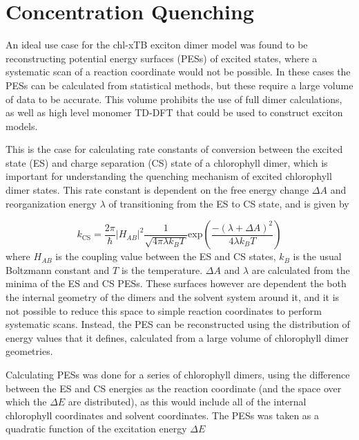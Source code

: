 \afterpartskip
\section{Concentration Quenching}
\label{sec:concentration_quenching}

An ideal use case for the chl-xTB exciton dimer model was found to be reconstructing
potential energy surfaces (PESs) of excited states, where a systematic scan of a
reaction coordinate would not be possible. In these cases the PESs can be calculated
from statistical methods, but these require a large volume of data to be accurate.
This volume prohibits the use of full dimer calculations, as well as high level
monomer TD-DFT that could be used to construct exciton models.

This is the case for calculating rate constants of conversion between the excited 
state (ES) and charge separation (CS) state of a chlorophyll dimer, which is important
for understanding the quenching mechanism of excited chlorophyll dimer states. This
rate constant is dependent on the free energy change $\Delta A$ and reorganization
energy $\lambda$ of transitioning from the ES to CS state, and is given by

\begin{equation}
    k_{\text{CS}} = \frac{2\pi}{\hbar} \left\lvert H_{AB} \right\rvert^2 \frac{1}{\sqrt{4 \pi \lambda k_B T}}\text{exp}\left(\frac{-\left(\lambda + \Delta A\right)^2}{4 \lambda k_B T}\right)
\end{equation}
%
where $H_{AB}$ is the coupling value between the ES and CS states, $k_B$ is the 
usual Boltzmann constant and $T$ is the temperature. $\Delta A$ and $\lambda$ are
calculated from the minima of the ES and CS PESs. These surfaces however are 
dependent the both the internal geometry of the dimers and the solvent system around
it, and it is not possible to reduce this space to simple reaction coordinates to 
perform systematic scans. Instead, the PES can be reconstructed using the distribution 
of energy values that it defines, calculated from a large volume of chlorophyll 
dimer geometries.

Calculating PESs was done for a series of chlorophyll dimers, using the difference
between the ES and CS energies as the reaction coordinate (and the space over which
the $\Delta E$ are  distributed), as this would include all of the internal chlorophyll
coordinates and solvent coordinates. The PESs was taken as a quadratic function
of the excitation energy $\Delta E$

